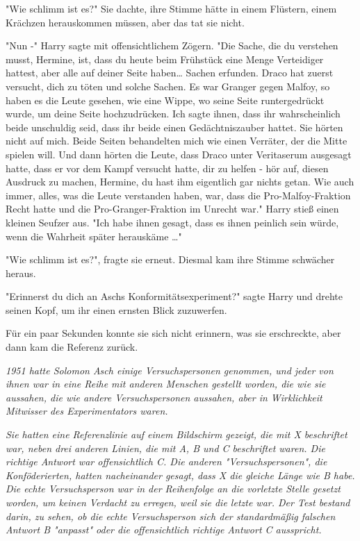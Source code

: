 {"Wie schlimm ist es?" Sie dachte, ihre Stimme hätte in einem Flüstern, einem Krächzen herauskommen müssen, aber das tat sie nicht.

"Nun -" Harry sagte mit offensichtlichem Zögern. "Die Sache, die du verstehen musst, Hermine, ist, dass du heute beim Frühstück eine Menge Verteidiger hattest, aber alle auf deiner Seite haben… Sachen erfunden. Draco hat zuerst versucht, dich zu töten und solche Sachen. Es war Granger gegen Malfoy, so haben es die Leute gesehen, wie eine Wippe, wo seine Seite runtergedrückt wurde, um deine Seite hochzudrücken. Ich sagte ihnen, dass ihr wahrscheinlich beide unschuldig seid, dass ihr beide einen Gedächtniszauber hattet. Sie hörten nicht auf mich. Beide Seiten behandelten mich wie einen Verräter, der die Mitte spielen will. Und dann hörten die Leute, dass Draco unter Veritaserum ausgesagt hatte, dass er vor dem Kampf versucht hatte, dir zu helfen - hör auf, diesen Ausdruck zu machen, Hermine, du hast ihm eigentlich gar nichts getan. Wie auch immer, alles, was die Leute verstanden haben, war, dass die Pro-Malfoy-Fraktion Recht hatte und die Pro-Granger-Fraktion im Unrecht war." Harry stieß einen kleinen Seufzer aus. "Ich habe ihnen gesagt, dass es ihnen peinlich sein würde, wenn die Wahrheit später herauskäme …"

"Wie schlimm ist es?", fragte sie erneut. Diesmal kam ihre Stimme schwächer heraus.

"Erinnerst du dich an Aschs Konformitätsexperiment?" sagte Harry und drehte seinen Kopf, um ihr einen ernsten Blick zuzuwerfen.

Für ein paar Sekunden konnte sie sich nicht erinnern, was sie erschreckte, aber dann kam die Referenz zurück.

\emph{1951 hatte Solomon Asch einige Versuchspersonen genommen, und jeder von ihnen war in eine Reihe mit anderen Menschen gestellt worden, die wie sie aussahen, die wie andere Versuchspersonen aussahen, aber in Wirklichkeit Mitwisser des Experimentators waren.}

\emph{Sie hatten eine Referenzlinie auf einem Bildschirm gezeigt, die mit X beschriftet war, neben drei anderen Linien, die mit A, B und C beschriftet waren. Die richtige Antwort war offensichtlich C. Die anderen "Versuchspersonen", die Konföderierten, hatten nacheinander gesagt, dass X die gleiche Länge wie B habe. Die echte Versuchsperson war in der Reihenfolge an die vorletzte Stelle gesetzt worden, um keinen Verdacht zu erregen, weil sie die letzte war. Der Test bestand darin, zu sehen, ob die echte Versuchsperson sich der standardmäßig falschen Antwort B "anpasst" oder die offensichtlich richtige Antwort C ausspricht.}

}
